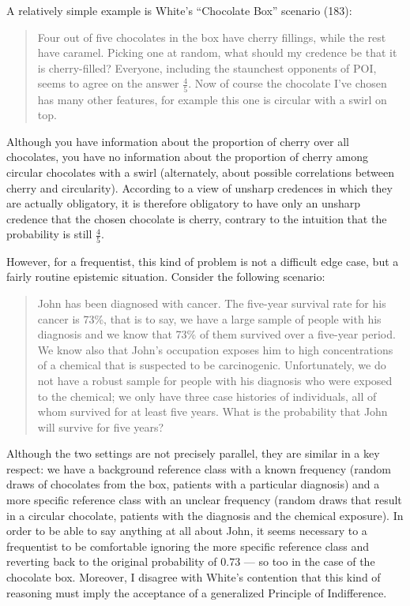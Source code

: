 \documentclass[letterpaper,12pt]{article}
\begin{document}
A relatively simple example is White's ``Chocolate Box'' scenario (183):
\begin{quotation}
Four out of five chocolates in the box have cherry fillings, while the rest have caramel. Picking one at random, what should my credence be that it is cherry-filled? Everyone, including the staunchest opponents of POI, seems to agree on the answer $\frac{4}{5}$. Now of course the chocolate I've chosen has many other features, for example this one is circular with a swirl on top.
\end{quotation}
Although you have information about the proportion of cherry over all chocolates, you have no information about the proportion of cherry among circular chocolates with a swirl (alternately, about possible correlations between cherry and circularity). According to a view of unsharp credences in which they are actually obligatory, it is therefore obligatory to have only an unsharp credence that the chosen chocolate is cherry, contrary to the intuition that the probability is still $\frac{4}{5}$.

However, for a frequentist, this kind of problem is not a difficult edge case, but a fairly routine epistemic situation. Consider the following scenario:
\begin{quotation}
John has been diagnosed with cancer. The five-year survival rate for his cancer is 73\%, that is to say, we have a large sample of people with his diagnosis and we know that 73\% of them survived over a five-year period. We know also that John's occupation exposes him to high concentrations of a chemical that is suspected to be carcinogenic. Unfortunately, we do not have a robust sample for people with his diagnosis who were exposed to the chemical; we only have three case histories of individuals, all of whom survived for at least five years. What is the probability that John will survive for five years?
\end{quotation}
Although the two settings are not precisely parallel, they are similar in a key respect: we have a background reference class with a known frequency (random draws of chocolates from the box, patients with a particular diagnosis) and a more specific reference class with an unclear frequency (random draws that result in a circular chocolate, patients with the diagnosis and the chemical exposure). In order to be able to say anything at all about John, it seems necessary to a frequentist to be comfortable ignoring the more specific reference class and reverting back to the original probability of $0.73$ --- so too in the case of the chocolate box. Moreover, I disagree with White's contention \citeyearpar[170]{White2009-WHIESA} that this kind of reasoning must imply the acceptance of a generalized Principle of Indifference.
\end{document}
